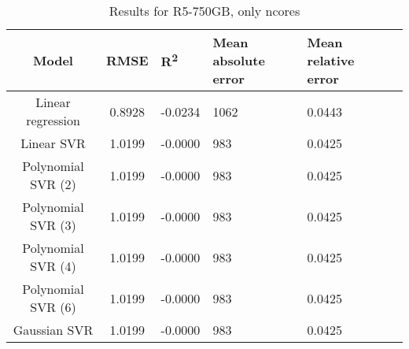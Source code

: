 \begin{table}[H]
\centering
\begin{adjustbox}{center}
\begin{tabular}{c | c M{1.2cm} M{2.5cm} M{2.5cm} M{1.8cm}}
Model & RMSE & R\textsuperscript{2} & Mean absolute error & Mean relative error \tabularnewline
\hline
Linear regression & 0.8928 & -0.0234 &   1062 & 0.0443 \\
Linear SVR & 1.0199 & -0.0000 &    983 & 0.0425 \\
Polynomial SVR (2) & 1.0199 & -0.0000 &    983 & 0.0425 \\
Polynomial SVR (3) & 1.0199 & -0.0000 &    983 & 0.0425 \\
Polynomial SVR (4) & 1.0199 & -0.0000 &    983 & 0.0425 \\
Polynomial SVR (6) & 1.0199 & -0.0000 &    983 & 0.0425 \\
Gaussian SVR & 1.0199 & -0.0000 &    983 & 0.0425 \\
\end{tabular}
\end{adjustbox}
\\
\caption{Results for R5-750GB, only ncores}
\label{tab:only_1_linear_R5_750}
\end{table}

